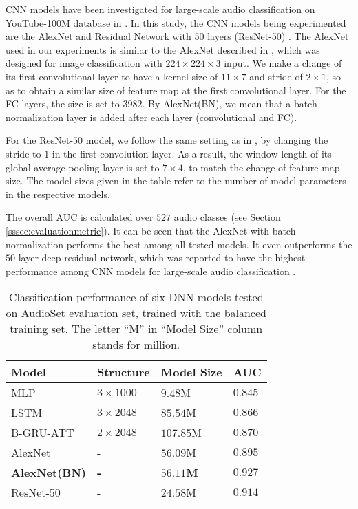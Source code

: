 \documentclass{article}
\begin{document}
CNN models have been investigated for large-scale audio classification on YouTube-100M database in \cite{googlecnnaudioclass}. In this study, the CNN models being experimented are the AlexNet and Residual Network with 50 layers (ResNet-50) \cite{deepresnet}. The AlexNet used in our experiments is similar to the AlexNet described in \cite{newalexnet}, which was designed for image classification with $224 \times 224 \times 3$ input. We make a change of its first convolutional layer to have a kernel size of $11 \times 7$ and stride of $2 \times 1$, so as to obtain a similar size of feature map at the first convolutional layer. For the FC layers, the size is set to $3982$. By AlexNet(BN), we mean that a batch normalization layer is added after each layer (convolutional and FC).


For the ResNet-$50$ model, we follow the same setting as in \cite{googlecnnaudioclass}, by changing the stride to $1$ in the first convolution layer. As a result, the window length of its global average pooling layer is set to $7\times 4$, to match the change of feature map size. The model sizes given in the table refer to the number of model parameters in the respective models.

The overall AUC is calculated over $527$ audio classes (see Section \ref{sssec:evaluationmetric}). It can be seen that the AlexNet with batch normalization performs the best among all tested models. It even outperforms the $50$-layer deep residual network, which was reported to have the highest performance among CNN models for large-scale audio classification \cite{googlecnnaudioclass}.


\begin{table}[]
\centering
\caption{Classification performance of six DNN models tested on AudioSet evaluation set, trained with the balanced training set. The letter ``M'' in ``Model Size'' column stands for million.}
\label{tb-model-compare}
\begin{tabular}{|l|l|l|l|}
\hline
Model       & Structure & Model Size       & AUC   \\ \hline
MLP         & $3\times1000$    & $9.48$M            & $0.845$ \\ \hline
LSTM        & $3\times2048$    & $85.54$M           & $0.866$ \\ \hline
B-GRU-ATT   & $2\times2048$    & $107.85$M          & $0.870$ \\ \hline
AlexNet     & -                & $56.09$M           & $0.895$ \\ \hline
\textbf{AlexNet(BN)} & \textbf{-}      & \textbf{$\mathbf{56.11}$M}     & \textbf{$\mathbf{0.927}$} \\ \hline
ResNet-50   & -                & $24.58$M           & $0.914$ \\ \hline
\end{tabular}
\end{table}
\end{document}
